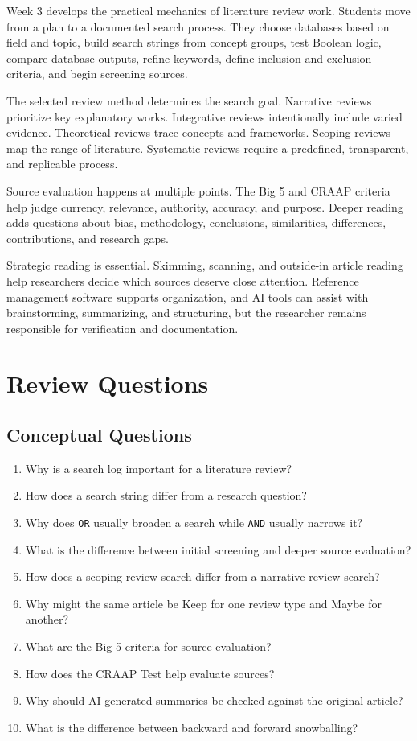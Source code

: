 \documentclass[11pt,letterpaper]{article}
\begin{document}
Week 3 develops the practical mechanics of literature review work. Students move from a plan to a documented search process. They choose databases based on field and topic, build search strings from concept groups, test Boolean logic, compare database outputs, refine keywords, define inclusion and exclusion criteria, and begin screening sources.

The selected review method determines the search goal. Narrative reviews prioritize key explanatory works. Integrative reviews intentionally include varied evidence. Theoretical reviews trace concepts and frameworks. Scoping reviews map the range of literature. Systematic reviews require a predefined, transparent, and replicable process.

Source evaluation happens at multiple points. The Big 5 and CRAAP criteria help judge currency, relevance, authority, accuracy, and purpose. Deeper reading adds questions about bias, methodology, conclusions, similarities, differences, contributions, and research gaps.

Strategic reading is essential. Skimming, scanning, and outside-in article reading help researchers decide which sources deserve close attention. Reference management software supports organization, and AI tools can assist with brainstorming, summarizing, and structuring, but the researcher remains responsible for verification and documentation.

\section{Review Questions}

\subsection{Conceptual Questions}

\begin{enumerate}
  \item Why is a search log important for a literature review?
  \item How does a search string differ from a research question?
  \item Why does \texttt{OR} usually broaden a search while \texttt{AND} usually narrows it?
  \item What is the difference between initial screening and deeper source evaluation?
  \item How does a scoping review search differ from a narrative review search?
  \item Why might the same article be Keep for one review type and Maybe for another?
  \item What are the Big 5 criteria for source evaluation?
  \item How does the CRAAP Test help evaluate sources?
  \item Why should AI-generated summaries be checked against the original article?
  \item What is the difference between backward and forward snowballing?
\end{enumerate}
\end{document}
